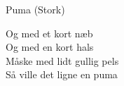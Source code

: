 \begin{song}{Puma (Stork)}{}

  \begin{SBSection*}
    Og med et kort næb\\
    Og med en kort hals\\
    Måske med lidt gullig pels\\
    Så ville det ligne en puma
  \end{SBSection*}

  \begin{SBChorus}
  \end{SBChorus}


  \begin{SBSection*}
  \end{SBSection*}

\end{song}
